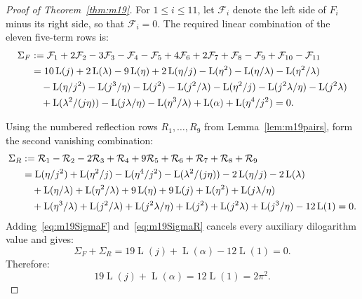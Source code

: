 \documentclass[preprint,12pt,number]{elsarticle}
\theoremstyle{remark}
\newcommand{\Lr}{\operatorname{L}}
\begin{document}
\begin{proof}[Proof of Theorem~\ref{thm:m19}]
For $1\le i\le 11$, let $\mathcal F_i$ denote the left side of $F_i$
minus its right side, so that $\mathcal F_i=0$.  The required linear
combination of the eleven five-term rows is:
\begin{align}
\Sigma_F
&:=\mathcal F_1+2\mathcal F_2-3\mathcal F_3-\mathcal F_4-\mathcal F_5
   +4\mathcal F_6+2\mathcal F_7+\mathcal F_8-\mathcal F_9
   +\mathcal F_{10}-\mathcal F_{11} \notag\\
&=10\Lr(j)+2\Lr(\lambda)-9\Lr(\eta)+2\Lr(\eta/j)-\Lr(\eta^2)
   -\Lr(\eta/\lambda)-\Lr(\eta^2/\lambda) \notag\\
&\quad-\Lr(\eta/j^2)-\Lr(j^3/\eta)-\Lr(j^2)-\Lr(j^2/\lambda)
   -\Lr(\eta^2/j)-\Lr(j^2\lambda/\eta)-\Lr(j^2\lambda) \notag\\
&\quad+\Lr(\lambda^2/(j\eta))-\Lr(j\lambda/\eta)-\Lr(\eta^3/\lambda)
   +\Lr(\alpha)+\Lr(\eta^4/j^2)=0. \label{eq:m19SigmaF}
\end{align}

Using the numbered reflection rows $R_1,\ldots,R_9$ from
Lemma~\ref{lem:m19pairs}, form the second vanishing combination:
\begin{align}
\Sigma_R
&:=\mathcal R_1-\mathcal R_2-2\mathcal R_3+\mathcal R_4
   +9\mathcal R_5+\mathcal R_6+\mathcal R_7+\mathcal R_8+\mathcal R_9 \notag\\
&=\Lr(\eta/j^2)+\Lr(\eta^2/j)-\Lr(\eta^4/j^2)-\Lr(\lambda^2/(j\eta))
   -2\Lr(\eta/j)-2\Lr(\lambda) \notag\\
&\quad+\Lr(\eta/\lambda)+\Lr(\eta^2/\lambda)+9\Lr(\eta)+9\Lr(j)
   +\Lr(\eta^2)+\Lr(j\lambda/\eta) \notag\\
&\quad+\Lr(\eta^3/\lambda)+\Lr(j^2/\lambda)+\Lr(j^2\lambda/\eta)
   +\Lr(j^2)+\Lr(j^2\lambda)+\Lr(j^3/\eta)-12\Lr(1)=0.
   \label{eq:m19SigmaR}
\end{align}
Adding~\eqref{eq:m19SigmaF} and~\eqref{eq:m19SigmaR} cancels every
auxiliary dilogarithm value and gives:
\begin{equation}\label{eq:m19finalcancel}
\Sigma_F+\Sigma_R
=19\Lr(j)+\Lr(\alpha)-12\Lr(1)=0.
\end{equation}
Therefore:
\[
19\Lr(j)+\Lr(\alpha)=12\Lr(1)=2\pi^2.
\]
\end{proof}
\end{document}
